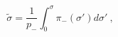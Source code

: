 \begin{equation}
   \tilde\sigma = \frac{1}{p_-}
   \int_0^{\sigma} \pi_-(\sigma') d\sigma' \ ,
\end{equation}

